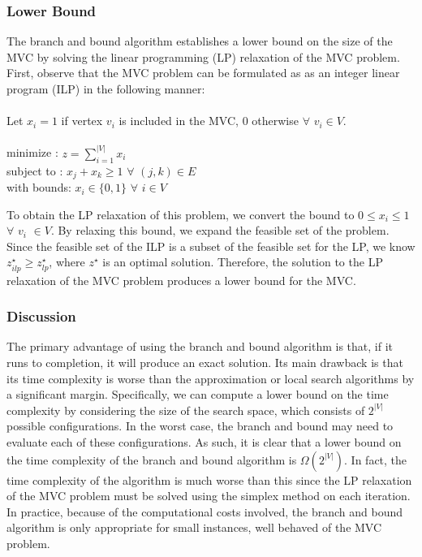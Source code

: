 \documentclass{sig-alternate-05-2015}
\begin{document}
\subsubsection{Lower Bound}
The branch and bound algorithm establishes a lower bound on the size of the MVC by solving the linear programming (LP) relaxation of the MVC problem. First, observe that the MVC problem can be formulated as as an integer linear program (ILP) in the following manner:
\\
\\
Let $x_i = 1$ if vertex $v_i$ is included in the MVC, $0$ otherwise $\forall$ $v_i \in V$.
\\
\\
minimize   : $z=\sum_{i=1}^{|V|} x_i$
\\
subject to : $x_j + x_k \geq 1$ $ \forall$ $ (j,k) \in E$
\\
with bounds: $ x_i \in \lbrace 0,1 \rbrace$ $\forall$ $i \in V$
\par
To obtain the LP relaxation of this problem, we convert the bound to $ 0 \leq x_i \leq 1$ $\forall$ $v_i$ $\in V$. By relaxing this bound, we expand the feasible set of the problem. Since the feasible set of the ILP is a subset of the feasible set for the LP, we know $z_{ilp}^{\star} \geq z_{lp}^{\star}$, where $z^{\star}$ is an optimal solution. Therefore, the solution to the LP relaxation of the MVC problem produces a lower bound for the MVC.
\subsubsection{Discussion}
The primary advantage of using the branch and bound algorithm is that, if it runs to completion, it will produce an exact solution. Its main drawback is that its time complexity is worse than the approximation or local search algorithms by a significant margin. Specifically, we can compute a lower bound on the time complexity by considering the size of the search space, which consists of $2^{|V|}$ possible configurations. In the worst case, the branch and bound may need to evaluate each of these configurations. As such, it is clear that a lower bound on the time complexity of the branch and bound algorithm is $\Omega (2^{|V|})$. In fact, the time complexity of the algorithm is much worse than this since the LP relaxation of the MVC problem must be solved using the simplex method on each iteration. In practice, because of the computational costs involved, the branch and bound algorithm is only appropriate for small instances, well behaved of the MVC problem.
\end{document}
